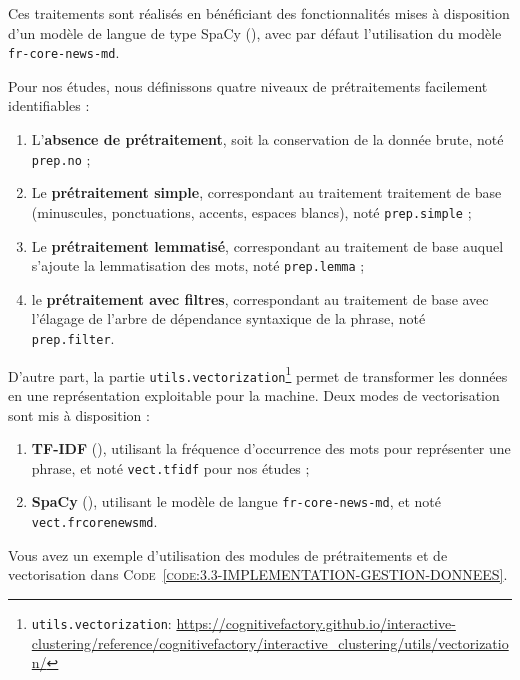 		Ces traitements sont réalisés en bénéficiant des fonctionnalités mises à disposition d'un modèle de langue de type SpaCy (\cite{honnibal-montani:2017:spacy-natural-language}), avec par défaut l'utilisation du modèle \texttt{fr-core-news-md}.
		
		Pour nos études, nous définissons quatre niveaux de prétraitements facilement identifiables :
		\begin{enumerate}
			\item L'\textbf{absence de prétraitement}, soit la conservation de la donnée brute, noté \texttt{prep.no} ;
			\item Le \textbf{prétraitement simple}, correspondant au traitement traitement de base (minuscules, ponctuations, accents, espaces blancs), noté \texttt{prep.simple} ; 
			\item Le \textbf{prétraitement lemmatisé}, correspondant au traitement de base auquel s'ajoute la lemmatisation des mots, noté \texttt{prep.lemma} ;
			\item le \textbf{prétraitement avec filtres}, correspondant au traitement de base avec l'élagage de l'arbre de dépendance syntaxique de la phrase, noté \texttt{prep.filter}.
		\end{enumerate}
		
		
		D'autre part, la partie \texttt{utils.vectorization}\footnote{
			\texttt{utils.vectorization}: \url{https://cognitivefactory.github.io/interactive-clustering/reference/cognitivefactory/interactive_clustering/utils/vectorization/}
		} permet de transformer les données en une représentation exploitable pour la machine.
		Deux modes de vectorisation sont mis à disposition :
		\begin{enumerate}
			\item \textbf{TF-IDF} (\cite{ramos:2003:using-tfidf-determine}), utilisant la fréquence d'occurrence des mots pour représenter une phrase, et noté \texttt{vect.tfidf} pour nos études ;
			\item \textbf{SpaCy} (\cite{honnibal-montani:2017:spacy-natural-language}), utilisant le modèle de langue \texttt{fr-core-news-md}, et noté \texttt{vect.frcorenewsmd}.
		\end{enumerate}
		
		Vous avez un exemple d'utilisation des modules de prétraitements et de vectorisation dans \textsc{Code~\ref{code:3.3-IMPLEMENTATION-GESTION-DONNEES}}.
		

